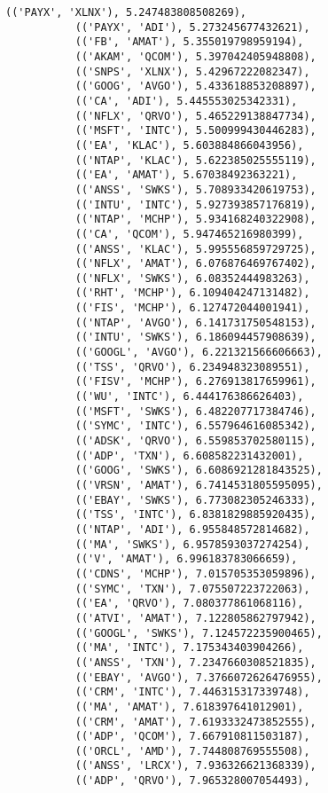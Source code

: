 \documentclass[11pt]{article}
\begin{document}
\begin{Verbatim}[commandchars=\\\{\}]
           (('PAYX', 'XLNX'), 5.247483808508269),
           (('PAYX', 'ADI'), 5.273245677432621),
           (('FB', 'AMAT'), 5.355019798959194),
           (('AKAM', 'QCOM'), 5.397042405948808),
           (('SNPS', 'XLNX'), 5.42967222082347),
           (('GOOG', 'AVGO'), 5.433618853208897),
           (('CA', 'ADI'), 5.445553025342331),
           (('NFLX', 'QRVO'), 5.465229138847734),
           (('MSFT', 'INTC'), 5.500999430446283),
           (('EA', 'KLAC'), 5.603884866043956),
           (('NTAP', 'KLAC'), 5.622385025555119),
           (('EA', 'AMAT'), 5.67038492363221),
           (('ANSS', 'SWKS'), 5.708933420619753),
           (('INTU', 'INTC'), 5.927393857176819),
           (('NTAP', 'MCHP'), 5.934168240322908),
           (('CA', 'QCOM'), 5.947465216980399),
           (('ANSS', 'KLAC'), 5.995556859729725),
           (('NFLX', 'AMAT'), 6.076876469767402),
           (('NFLX', 'SWKS'), 6.08352444983263),
           (('RHT', 'MCHP'), 6.109404247131482),
           (('FIS', 'MCHP'), 6.127472044001941),
           (('NTAP', 'AVGO'), 6.141731750548153),
           (('INTU', 'SWKS'), 6.186094457908639),
           (('GOOGL', 'AVGO'), 6.221321566606663),
           (('TSS', 'QRVO'), 6.234948323089551),
           (('FISV', 'MCHP'), 6.276913817659961),
           (('WU', 'INTC'), 6.444176386626403),
           (('MSFT', 'SWKS'), 6.482207717384746),
           (('SYMC', 'INTC'), 6.557964616085342),
           (('ADSK', 'QRVO'), 6.559853702580115),
           (('ADP', 'TXN'), 6.608582231432001),
           (('GOOG', 'SWKS'), 6.6086921281843525),
           (('VRSN', 'AMAT'), 6.7414531805595095),
           (('EBAY', 'SWKS'), 6.773082305246333),
           (('TSS', 'INTC'), 6.8381829885920435),
           (('NTAP', 'ADI'), 6.955848572814682),
           (('MA', 'SWKS'), 6.9578593037274254),
           (('V', 'AMAT'), 6.996183783066659),
           (('CDNS', 'MCHP'), 7.015705353059896),
           (('SYMC', 'TXN'), 7.075507223722063),
           (('EA', 'QRVO'), 7.080377861068116),
           (('ATVI', 'AMAT'), 7.122805862797942),
           (('GOOGL', 'SWKS'), 7.124572235900465),
           (('MA', 'INTC'), 7.175343403904266),
           (('ANSS', 'TXN'), 7.2347660308521835),
           (('EBAY', 'AVGO'), 7.3766072626476955),
           (('CRM', 'INTC'), 7.446315317339748),
           (('MA', 'AMAT'), 7.618397641012901),
           (('CRM', 'AMAT'), 7.6193332473852555),
           (('ADP', 'QCOM'), 7.667910811503187),
           (('ORCL', 'AMD'), 7.744808769555508),
           (('ANSS', 'LRCX'), 7.936326621368339),
           (('ADP', 'QRVO'), 7.965328007054493),

\end{Verbatim}
\end{document}

